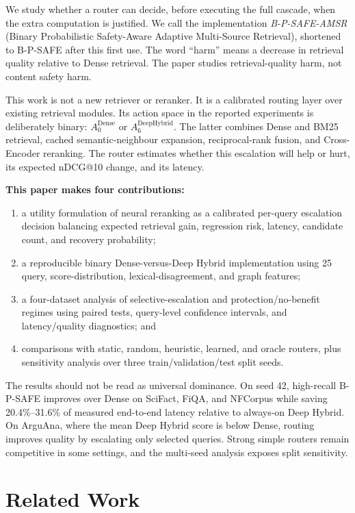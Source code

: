 \documentclass[10pt,journal]{IEEEtran}
\makeatletter
\newcommand{\bpsafe}{B-P-SAFE}
\newcommand{\deephybrid}{Deep Hybrid}
\newcommand{\ndcg}{nDCG@10}
\makeatother
\begin{document}
We study whether a router can decide, before executing the full cascade, when the extra computation is justified. We call the implementation \emph{B-P-SAFE-AMSR} (Binary Probabilistic Safety-Aware Adaptive Multi-Source Retrieval), shortened to \bpsafe{} after this first use. The word ``harm'' means a decrease in retrieval quality relative to Dense retrieval. The paper studies retrieval-quality harm, not content safety harm.

This work is not a new retriever or reranker. It is a calibrated routing layer over existing retrieval modules. Its action space in the reported experiments is deliberately binary: $A_0^{\mathrm{Dense}}$ or $A_6^{\mathrm{DeepHybrid}}$. The latter combines Dense and BM25 retrieval, cached semantic-neighbour expansion, reciprocal-rank fusion, and Cross-Encoder reranking. The router estimates whether this escalation will help or hurt, its expected \ndcg{} change, and its latency.

\textbf{This paper makes four contributions:}
\begin{enumerate}
    \item a utility formulation of neural reranking as a calibrated per-query escalation decision balancing expected retrieval gain, regression risk, latency, candidate count, and recovery probability;
    \item a reproducible binary Dense-versus-\deephybrid{} implementation using 25 query, score-distribution, lexical-disagreement, and graph features;
    \item a four-dataset analysis of selective-escalation and protection/no-benefit regimes using paired tests, query-level confidence intervals, and latency/quality diagnostics; and
    \item comparisons with static, random, heuristic, learned, and oracle routers, plus sensitivity analysis over three train/validation/test split seeds.
\end{enumerate}

The results should not be read as universal dominance. On seed 42, high-recall \bpsafe{} improves over Dense on SciFact, FiQA, and NFCorpus while saving 20.4\%--31.6\% of measured end-to-end latency relative to always-on \deephybrid{}. On ArguAna, where the mean \deephybrid{} score is below Dense, routing improves quality by escalating only selected queries. Strong simple routers remain competitive in some settings, and the multi-seed analysis exposes split sensitivity.

\section{Related Work}
\label{sec:related}
\end{document}
